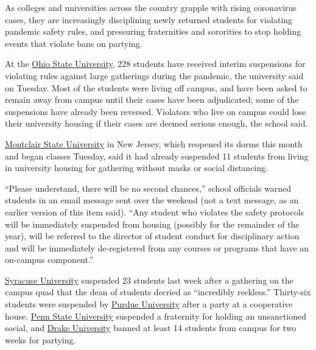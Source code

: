 As colleges and universities across the country grapple with rising
coronavirus cases, they are increasingly disciplining newly returned
students for violating pandemic safety rules, and pressuring
fraternities and sororities to stop holding events that violate bans on
partying.

At the
\href{https://slack-redir.net/link?url=https\%3A\%2F\%2Fsafeandhealthy.osu.edu\%2Fmessages\%2F2020\%2F08\%2F21\%2Fwe-can-do-together}{Ohio
State University}, 228 students have received interim suspensions for
violating rules against large gatherings during the pandemic, the
university said on Tuesday. Most of the students were living off campus,
and have been asked to remain away from campus until their cases have
been adjudicated; some of the suspensions have already been reversed.
Violators who live on campus could lose their university housing if
their cases are deemed serious enough, the school said.

\href{https://www.northjersey.com/story/news/essex/montclair/2020/08/24/msu-suspends-11-students-covid-safety-violations/3430519001/}{Montclair
State University} in New Jersey, which reopened its dorms this month and
began classes Tuesday, said it had already suspended 11 students from
living in university housing for gathering without masks or social
distancing.

``Please understand, there will be no second chances,'' school officials
warned students in an email message sent over the weekend (not a text
message, as an earlier version of this item said). ``Any student who
violates the safety protocols will be immediately suspended from housing
(possibly for the remainder of the year), will be referred to the
director of student conduct for disciplinary action and will be
immediately de-registered from any courses or programs that have an
on-campus component.''

\href{https://news.syr.edu/blog/2020/08/20/additional-information-about-last-nights-quad-gathering/}{Syracuse
University} suspended 23 students last week after a gathering on the
campus quad that the dean of students decried as ``incredibly
reckless.'' Thirty-six students were suspended by
\href{https://www.nytimes3xbfgragh.onion/2020/08/22/us/college-campus-covid.html}{Purdue
University} after a party at a cooperative house.
\href{https://news.psu.edu/story/629021/2020/08/20/campus-life/president-eric-barron-shares-message-community}{Penn
State University} suspended a fraternity for holding an unsanctioned
social, and
\href{https://www.drake.edu/coronavirus/updates/dean-of-students/?n=messagesfromdos-accordion\&p=1}{Drake
University} banned at least 14 students from campus for two weeks for
partying.


